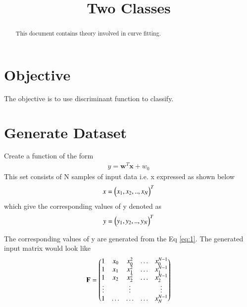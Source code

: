 \documentclass[journal,12pt,twocolumn]{IEEEtran}
\begin{document}
\makeatletter
{}
\makeatother
\let\StandardTheFigure\thefigure
\let\vec\mathbf
\renewcommand{\thefigure}{\theproblem}
\def\putbox#1#2#3{\makebox[0in][l]{\makebox[#1][l]{}\raisebox{\baselineskip}[0in][0in]{\raisebox{#2}[0in][0in]{#3}}}}
     \def\rightbox#1{\makebox[0in][r]{#1}}
     \def\centbox#1{\makebox[0in]{#1}}
     \def\topbox#1{\raisebox{-\baselineskip}[0in][0in]{#1}}
\vspace{3cm}
\title{Two Classes}
\maketitle
\newpage
\bigskip
\renewcommand{\thefigure}{\theenumi}
\renewcommand{\thetable}{\theenumi}
\begin{abstract}
This document contains theory involved in curve fitting.
\end{abstract}
\section{\textbf{Objective}}
The objective is to use discriminant function to classify.
\section{Generate Dataset}
Create a function of the form
\begin{align}
    y = \vec{w}^{T}\vec{x} + w_{0} \label{eq:1}
\end{align}
This set consists of N samples of input data i.e. x expressed as shown below
\begin{align}
    x = \begin{pmatrix}x_{1}, x_{2}, .., x_{N}\end{pmatrix}^{T}
\end{align}
which give the corresponding values of y denoted as
\begin{align}
    y = \begin{pmatrix}y_{1}, y_{2}, .., y_{N}\end{pmatrix}^{T}
\end{align}

The corresponding values of y are generated from the Eq \eqref{eq:1}.
The generated input matrix would look like
\begin{align}
    \vec{F}= \myvec{ 1 & x_{0} & x_{0}^2 & \ldots & x_{0}^{N-1} \\
		1 & x_{1} & x_{1}^2 & \ldots & x_{1}^{N-1} \\
		1 & x_{2} & x_{2}^2 & \ldots & x_{2}^{N-1} \\
		\vdots & & \vdots &  & \vdots  \\
		    1 & \ldots & \ldots & \ldots & x_{N}^{N-1} }\label{eq:12}
\end{align}
\end{document}
